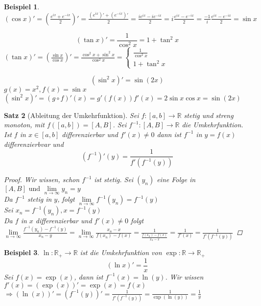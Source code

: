 \documentclass[a4paper,titlepage,oneside]{article}
\def\R{\ensuremath{\mathbb{R}} }
\def\im{\ensuremath{\mathit{i}} }
\def\e{\ensuremath{\mathit{e}} }
\renewcommand{\liminf}[2][n]{\ensuremath{\lim\limits_{#1 \rightarrow \infty}{#2}}}
\theoremstyle{thmstyle}
\newtheorem{satz}{Satz}[section]
\newtheorem{bsp}[satz]{Beispiel}
\theoremstyle{subthmstyle}
\begin{document}
\begin{bsp}
$\displaystyle  (\cos x)' = \left( \frac{\e^{\im x} + \e^{-\im x}}{2}\right)' = \frac{(\e^{\im x})' + (\e^{-\im x})'}{2} = \frac{\im \e^{\im x} - \im \e^{-\im x}}{2} = \im \frac{\e^{\im x} - \e^{-\im x}}{2} =  \frac{-1}{\im} \frac{\e^{\im x} - \e^{-\im x}}{2} = \sin x $
\item \[ (\tan x)' = \frac{1}{\cos^2  x} = 1 + \tan^2 x\]
$(\tan x)' = \left( \frac{\sin x}{\cos x} \right)' = \frac{\cos^2 x + \sin^2 x}{\cos^2 x} =\begin{cases} \frac{1}{\cos^2  x} \\ 1 + \tan^2 x \end{cases}$
\item \[(\sin^2 x)' = \sin (2x)\]
$g(x) = x^2, f(x) = \sin x$ \\
$(\sin^2 x)' = (g \circ f)'(x) = g'(f(x))f'(x) = 2 \sin x \cos x = \sin (2x)$
\end{bsp}

\begin{satz}[Ableitung der Umkehrfunktion]
Sei $f : [a,b] \to \R $ stetig und streng monoton, mit $f([a,b]) = [A,B]$. Sei $f^{-1} : [A,B] \to \R$ die Umkehrfunktion.
Ist $f$ in $x \in [a,b]$ differenzierbar und $f'(x) \ne 0$ dann ist $f^{-1}$ in $y = f(x)$ differenzierbvar und \[(f^{-1})' (y) = \frac{1}{f'(f^{-1}(y))}\]
\begin{proof}
Wir wissen, schon $f^{-1}$ ist stetig. Sei $(y_n)$ eine Folge in $[A, B] \text{ und } \liminf{y_n} = y$\\
Da $f^{-1}$ stetig in $y$, folgt $\liminf{f^{-1}(y_n)} = f^{-1}(y)$\\
Sei $x_n = f^{-1}(y_n), x= f^{-1}(y)$\\
Da $f$ in $x$ differenzierbar und $f'(x) \ne 0$ folgt $\liminf{\frac{f^{-1}(y_n) - f^{-1}(y)}{x_n - y}} = \liminf{\frac{x_n - x}{f(x_n)-f(x)}} = \frac{1}{\frac{f(x_n) - f(x)}{x_n - x}} = \frac{1}{f'(x)} = \frac{1}{f'(f^{-1}(y))}$
\end{proof}
\end{satz}

\begin{bsp}
$\ln : \R_+ \to \R$ ist die Umkehrfunktion von $\exp: \R \to \R_+$
\[(\ln x)' = \frac{1}{x}\]
Sei $f(x) = \exp(x)$, dann ist $f^{-1}(x) = \ln(y)$. Wir wissen $f'(x) = (\exp(x))' = \exp(x) = f(x)$
$\Rightarrow (\ln(x))' = (f^{-1}(y))' = \frac{1}{f'(f^{-1}(y))} = \frac{1}{\exp(\ln(y))} = \frac{1}{y}$
\end{bsp}
\end{document}
